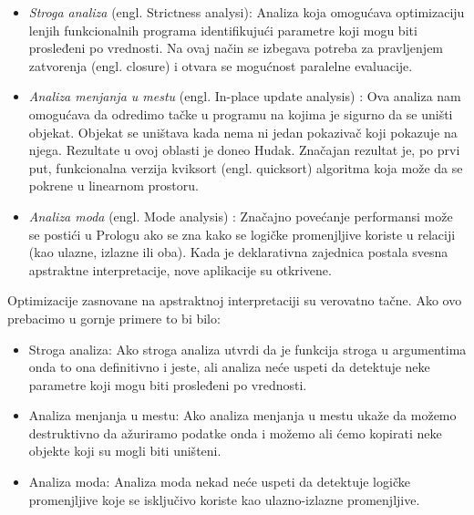 \begin{itemize}
\item \textit{Stroga analiza} (engl. Strictness analysi\cite{AbramskyHankin}):
Analiza koja omogućava optimizaciju lenjih funkcionalnih programa identifikujući parametre koji mogu biti prosleđeni po vrednosti. Na ovaj način se izbegava potreba za pravljenjem zatvorenja (engl. closure) i otvara se mogućnost paralelne evaluacije. 

\item \textit{Analiza menjanja u mestu} (engl. In-place update analysis) \cite{CannPhd}:
Ova analiza nam omogućava da odredimo tačke u programu na kojima je sigurno da se uništi objekat. Objekat se uništava kada nema ni jedan pokazivač koji pokazuje na njega. Rezultate u ovoj oblasti je doneo Hudak. Značajan rezultat je, po prvi put, funkcionalna verzija kviksort (engl. quicksort) algoritma koja može da se pokrene u linearnom prostoru. \cite{Girard1987}


\item \textit{Analiza moda} (engl. Mode analysis) \cite{AbramskyHankin}:
Značajno povećanje performansi može se postići u Prologu ako se zna kako se logičke promenjljive koriste u relaciji (kao ulazne, izlazne ili oba).
Kada je deklarativna zajednica postala svesna apstraktne interpretacije, nove aplikacije su otkrivene. 

\end{itemize}
Optimizacije zasnovane na apstraktnoj interpretaciji su verovatno tačne. Ako ovo prebacimo u gornje primere to bi bilo:

\begin{itemize}
\item Stroga analiza:
Ako stroga analiza utvrdi da je funkcija stroga u argumentima onda to ona definitivno i jeste, ali analiza neće uspeti da detektuje neke parametre koji mogu biti prosleđeni po vrednosti. 

\item Analiza menjanja u mestu:
Ako analiza menjanja u mestu ukaže da možemo destruktivno da ažuriramo podatke onda i možemo ali ćemo kopirati neke objekte koji su mogli biti uništeni. \cite{Girard1987}


\item Analiza moda:
Analiza moda nekad neće uspeti da detektuje logičke promenjljive koje se isključivo koriste kao ulazno-izlazne promenjljive. 

\end{itemize}

